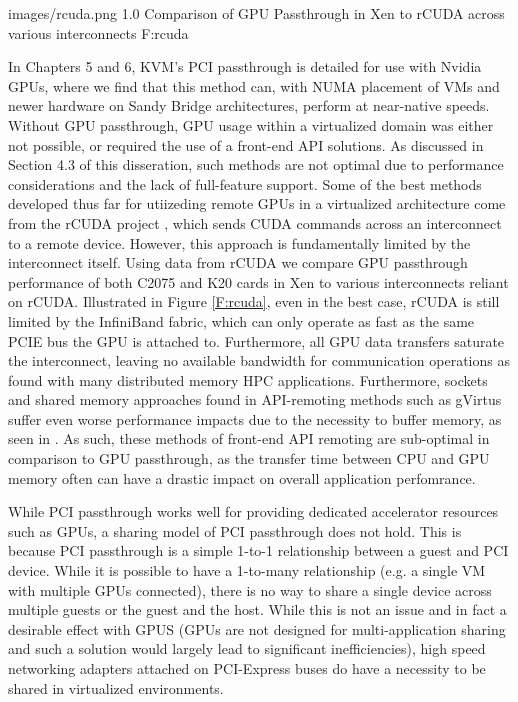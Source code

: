   {images/rcuda.png}
  {1.0}
  {Comparison of GPU Passthrough in Xen to rCUDA across various interconnects}
  {F:rcuda}

In Chapters 5 and 6, KVM's PCI passthrough is detailed for use with Nvidia GPUs, where we find that this method can, with NUMA placement of VMs and newer hardware on Sandy Bridge architectures, perform at near-native speeds. Without GPU passthrough, GPU usage within a virtualized domain was either not possible, or required the use of a front-end API solutions. As discussed in Section 4.3 of this disseration, such methods are not optimal due to performance considerations and the lack of full-feature support. Some of the best methods developed thus far for utiizeding remote GPUs in a virtualized architecture come from the rCUDA project \cite{duato2011enabling}, which sends CUDA commands across an interconnect to a remote device. However, this approach is fundamentally limited by the interconnect itself.  Using data from rCUDA \cite{silla2013rcuda} we compare GPU passthrough performance of both C2075 and K20 cards in Xen to various interconnects reliant on rCUDA.  Illustrated in Figure \ref{F:rcuda}, even in the best case, rCUDA is still limited by the InfiniBand fabric, which can only operate as fast as the same PCIE bus the GPU is attached to.  Furthermore,  all GPU data transfers saturate the interconnect, leaving no available bandwidth for communication operations as found with many distributed memory HPC applications.  Furthermore, sockets and shared memory approaches found in API-remoting methods such as gVirtus \cite{gvirtus} suffer even worse performance impacts due to the necessity to buffer memory, as seen in \cite{walters2015gpu}.   As such, these methods of front-end API remoting are sub-optimal in comparison to GPU passthrough, as the transfer time between CPU and GPU memory often can have a drastic impact on overall application perfomrance.

While PCI passthrough works well for providing dedicated accelerator resources such as GPUs, a sharing model of PCI passthrough does not hold. This is because PCI passthrough is a simple 1-to-1 relationship between a guest and PCI device. While it is possible to have a 1-to-many relationship (e.g. a single VM with multiple GPUs connected), there is no way to share a single device across multiple guests or the guest and the host. While this is not an issue and in fact a desirable effect with GPUS (GPUs are not designed for multi-application sharing and such a solution would largely lead to significant inefficiencies), high speed networking adapters attached on PCI-Express buses do have a necessity to be shared in virtualized environments.

